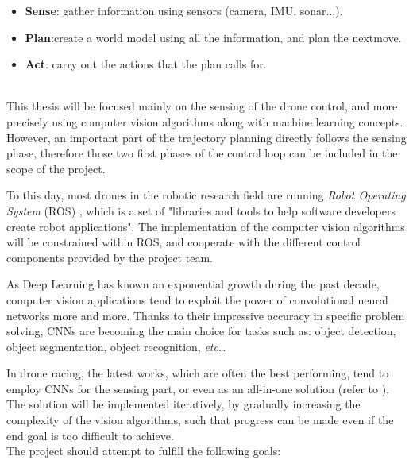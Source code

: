 \begin{itemize}
	\item{\textbf{Sense}}: gather information using sensors (camera, IMU, sonar...).
	\item{\textbf{Plan}}:create a world model using all the information, and plan
		the nextmove.
	\item{\textbf{Act}}: carry out the actions that the plan calls for.
\end{itemize}
~\\
This thesis will be focused mainly on the sensing of the drone control, and
more precisely using computer vision algorithms along with machine learning
concepts. However, an important part of the trajectory planning directly
follows the sensing phase, therefore those two first phases of the control loop
can be included in the scope of the project.

To this day, most drones in the robotic research field are running \emph{Robot
Operating System} (ROS) , which is a set of "libraries and
tools to help software developers create robot applications". The implementation
of the computer vision algorithms will be constrained within ROS, and cooperate
with the different control components provided by the project team.\\


As Deep Learning has known an exponential growth during the past decade,
computer vision applications tend to exploit the power of convolutional neural
networks more and more. Thanks to their impressive accuracy in specific problem
solving, CNNs are becoming the main choice for tasks such as: object detection,
object segmentation, object recognition, \emph{etc}\ldots

In drone racing, the latest works, which are often the best performing, tend to
employ CNNs for the sensing part, or even as an all-in-one solution (refer to
).\\


The solution will be implemented iteratively, by gradually increasing the
complexity of the vision algorithms, such that progress can be made even if the
end goal is too difficult to achieve.\\

The project should attempt to fulfill the following goals:

